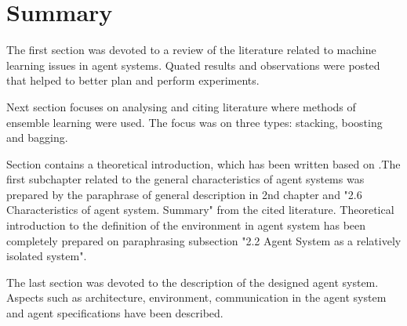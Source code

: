 \section{Summary}
The first section was devoted to a review of the literature related to machine learning issues in agent systems. Quated results and observations were posted that helped to better plan and perform experiments.


Next section focuses on analysing and citing literature where methods of ensemble learning were used. The focus was on three types: stacking, boosting and bagging.

Section contains a theoretical introduction, which has been written based on \cite{Dobrowolski}.The first subchapter related to the general characteristics of agent systems was prepared by the paraphrase of general description in 2nd chapter and "2.6 Characteristics of agent system. Summary" from the cited literature. Theoretical introduction to the definition of the environment in agent system has been completely prepared on paraphrasing subsection "2.2 Agent System as a relatively isolated system".


The last section was devoted to the description of the designed agent system. Aspects such as architecture, environment, communication in the agent system and agent specifications have been described.

